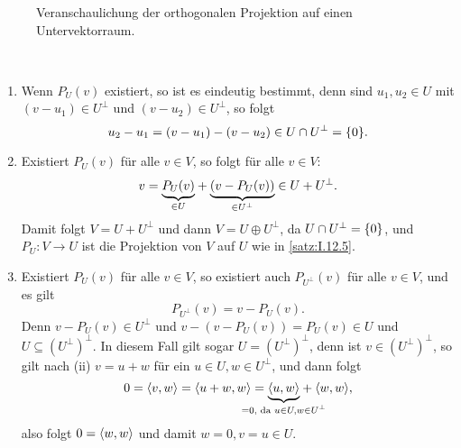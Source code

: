 \begin{figure}[h]
	\centering
	\caption{Veranschaulichung der orthogonalen Projektion auf einen Untervektorraum.}
\end{figure}
\newpage
\begin{bemerkung}
	\label{bem:4.4}
	\mbox{} \\[-1.4cm]
	\begin{enumerate}[(1)]
		\item Wenn $P_U(v)$ existiert, so ist es eindeutig bestimmt, denn sind $u_1,u_2 \in U$ mit $(v-u_1) \in U^\perp$ und $(v-u_2) \in U^\perp$, so folgt
		\[
			u_2 - u_1 = (v-u_1) - (v-u_2) \in U \cap U^\perp = \{0\}.
		\]
		\item Existiert $P_U(v)$ für alle $v \in V$, so folgt für alle $v \in V$:
		\[
			v = {\underbrace{P_U(v)}_{\in U}} + {\underbrace{(v-P_U(v))}_{\in U^\perp}} \in U + U^\perp.
		\]
		Damit folgt $V = U+U^\perp$ und dann $V = U \oplus U^\perp$, da $U \cap U^\perp = \{0\}$, und $P_U \colon V \rightarrow U$ ist die Projektion von $V$ auf $U$ wie in \autoref{satz:I.12.5}.
		\item Existiert $P_U(v)$ für alle $v \in V$, so existiert auch $P_{U^\perp}(v)$ für alle $v \in V$, und es gilt
		\[
			P_{U^\perp}(v) = v - P_U(v).
		\]
		Denn $v - P_U(v) \in U^\perp$ und $v-(v-P_U(v)) = P_U(v) \in U$ und $U \subseteq (U^\perp)^\perp$.
		In diesem Fall gilt sogar $U = (U^\perp)^\perp$, denn ist $v \in (U^\perp)^\perp$, so gilt nach (ii) $v = u+w$ für ein $u \in U, w \in U^\perp$, und dann folgt
		\[
			0 = \sk{v,w} = \sk{u+w,w} = \Underbrace{\sk{u,w}}{\mathclap{=0\text{, da } u \in U, w \in U^\perp}} + \sk{w,w},
		\]
		also folgt $0 = \left\langle w,w\right\rangle$ und damit $w = 0, v = u \in U$.
	\end{enumerate}
\end{bemerkung}

